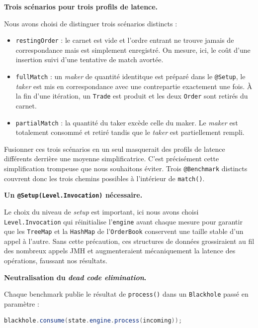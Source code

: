 \textbf{Trois scénarios pour trois profils de latence.} 

Nous avons choisi de distinguer trois scénarios distincts :

\begin{itemize}
    \item \texttt{restingOrder} : le carnet est vide et l'ordre entrant ne trouve jamais de correspondance mais est simplement enregistré. On mesure, ici, le coût d'une insertion suivi d'une tentative de match avortée. 
    \item \texttt{fullMatch} : un \textit{maker} de quantité identitque est préparé dans le \texttt{@Setup}, le \textit{taker} est mis en correspondance avec une contrepartie exactement une fois. À la fin d'une itération, un \texttt{Trade} est produit et les deux \texttt{Order} sont retirés du carnet. 
    \item \texttt{partialMatch} : la quantité du taker excède celle du maker. Le \textit{maker} est totalement consommé et retiré tandis que le \textit{taker} est partiellement rempli.
\end{itemize}

Fusionner ces trois scénarios en un seul masquerait des profils de latence différents derrière une moyenne simplificatrice. C'est précisément cette simplification trompeuse que nous souhaitons éviter. Trois \texttt{@Benchmark} distincts couvrent donc les trois chemins possibles à l'intérieur de \texttt{match()}.


\textbf{Un \texttt{@Setup(Level.Invocation)} nécessaire.} 

Le choix du niveau de \textit{setup} est important, ici nous avons choisi \texttt{Level.Invocation} qui réinitialise l'\texttt{engine} avant chaque mesure pour garantir que les \texttt{TreeMap} et la \texttt{HashMap} de l'\texttt{OrderBook} conservent une taille stable d'un appel à l'autre. Sans cette précaution, ces structures de données grossiraient au fil des nombreux appels JMH et augmenteraient mécaniquement la latence des opérations, faussant nos résultats. 

\textbf{Neutralisation du \textit{dead code elimination}.} 

Chaque benchmark publie le résultat de \texttt{process()} dans un \texttt{Blackhole} passé en
paramètre :

\begin{lstlisting}[language=Java, caption={Neutralisation du DCE via Blackhole}]
blackhole.consume(state.engine.process(incoming));
\end{lstlisting}

